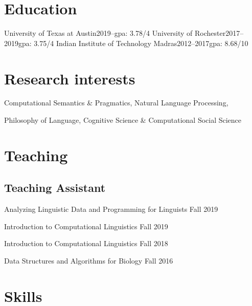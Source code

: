 \documentclass[10pt,a4paper]{mycv}
\begin{document}
\cfoot{\sansc \thepage}
\makecvtitle


\section{Education}
    {University of Texas at Austin}{2019--}{\rmsc gpa: 3.78/4}{}
    {University of Rochester}{2017--2019}{\rmsc gpa: 3.75/4}{}
    {Indian Institute of Technology Madras}{2012--2017}{\rmsc gpa: 8.68/10}{}

\section{Research interests}

{\large Computational Semantics \& Pragmatics, Natural Language Processing,

\vspace{0.5ex}

Philosophy of Language, Cognitive Science \& Computational Social Science}


\begingroup
\setlength\bibitemsep{2ex}
\printbibliography[title={\sansc Papers}, nottype=unpublished]
\endgroup

\begingroup
\setlength\bibitemsep{2ex}
\printbibliography[title={\sansc Talks}, type=unpublished]
\endgroup


\section{Teaching}

\subsection{Teaching Assistant}

Analyzing Linguistic Data and Programming for Linguists \hfill Fall 2019

Introduction to Computational Linguistics \hfill Fall 2019

Introduction to Computational Linguistics \hfill Fall 2018

Data Structures and Algorithms for Biology \hfill Fall 2016

\section{Skills}
\end{document}
